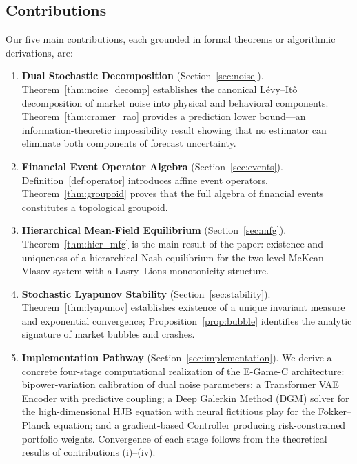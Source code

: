 \documentclass[12pt,a4paper]{article}
\theoremstyle{plain}
\theoremstyle{definition}
\newcommand{\1}{\mathbbm{1}}
\begin{document}
\subsection{Contributions}

Our five main contributions, each grounded in formal theorems or algorithmic
derivations, are:

\begin{enumerate}[label=(\roman*)]
\item \textbf{Dual Stochastic Decomposition} (Section~\ref{sec:noise}).
  Theorem~\ref{thm:noise_decomp} establishes the canonical Lévy--Itô
  decomposition of market noise into physical and behavioral components.
  Theorem~\ref{thm:cramer_rao} provides a prediction lower bound—an
  information-theoretic impossibility result showing that no estimator can
  eliminate both components of forecast uncertainty.

\item \textbf{Financial Event Operator Algebra} (Section~\ref{sec:events}).
  Definition~\ref{def:operator} introduces affine event operators.
  Theorem~\ref{thm:groupoid} proves that the full algebra of financial events
  constitutes a topological groupoid.

\item \textbf{Hierarchical Mean-Field Equilibrium} (Section~\ref{sec:mfg}).
  Theorem~\ref{thm:hier_mfg} is the main result of the paper: existence and
  uniqueness of a hierarchical Nash equilibrium for the two-level McKean--Vlasov
  system with a Lasry--Lions monotonicity structure.

\item \textbf{Stochastic Lyapunov Stability} (Section~\ref{sec:stability}).
  Theorem~\ref{thm:lyapunov} establishes existence of a unique invariant
  measure and exponential convergence; Proposition~\ref{prop:bubble} identifies
  the analytic signature of market bubbles and crashes.

\item \textbf{Implementation Pathway} (Section~\ref{sec:implementation}).
  We derive a concrete four-stage computational realization of the E-Game-C
  architecture: bipower-variation calibration of dual noise parameters;
  a Transformer VAE Encoder with predictive coupling; a Deep Galerkin Method
  (DGM) solver for the high-dimensional HJB equation with neural fictitious
  play for the Fokker--Planck equation; and a gradient-based Controller
  producing risk-constrained portfolio weights.  Convergence of each stage
  follows from the theoretical results of contributions (i)--(iv).
\end{enumerate}
\end{document}
